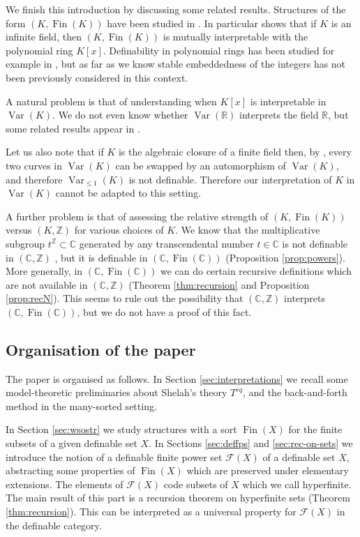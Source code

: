 \documentclass{amsart}
\newcommand{\R}{\mathbb R}
\newcommand{\C}{\mathbb C}
\newcommand{\Z}{\mathbb Z}
\newcommand{\Fin}{\operatorname{Fin}}
\theoremstyle{plain}
\theoremstyle{definition}
\newcommand{\F}{\mathcal{F}}
\newcommand{\Var}[1]{\operatorname{Var}(#1)}
\newcommand{\nVar}[2]{\operatorname{Var}_{#2} (#1)}
\begin{document}
We finish this introduction by discussing some related results. 
Structures of the form $(K, \Fin(K))$ have been studied in \cite{Bau}. In particular \cite{Bau} shows that if $K$ is an infinite field, then $(K, \Fin(K))$ is mutually interpretable with the polynomial ring $K[x]$. Definability in polynomial rings has been studied for example in \cite[Chapter 3]{JL}, but as far as we know stable embeddedness of the integers has not been previously considered in this context.  

A natural problem is that of understanding when $K[x]$ is interpretable in $\Var K$. We do not even know whether $\Var {\R}$ interprets the field $\R$, but some related results appear in \cite{Ast, Tre}. 

Let us also note that if $K$ is the algebraic closure of a finite field then, by \cite{Wie}, every two curves in $\Var{K}$ can be swapped by an automorphism of $\Var{K}$, and therefore $\nVar{K}{\leq 1}$ is not definable. Therefore our interpretation of $K$ in $\Var{K}$ cannot be adapted to this setting.

A further problem is that of assessing the relative strength of $(K, \Fin(K))$ versus $(K, \Z)$ for various choices of $K$. We know that the multiplicative subgroup $t^\Z\subset \C$ generated by any transcendental number $t\in \C$ is not definable in $(\C, \Z)$ \cite[Proposition 2.2]{Toffalori2010}, but it is definable in $(\C, \Fin(\C))$ (Proposition \ref{prop:powers}). More generally, in $(\C, \Fin(\C))$ we can do certain recursive definitions which are not available in $(\C, \Z)$ (Theorem \ref{thm:recursion} and Proposition \ref{prop:recN}). This seems to rule out the possibility that $(\C, \Z)$ interprets $(\C, \Fin(\C))$, but we do not have a proof of this fact.  



\subsection{Organisation of the paper} The paper is organised as follows. In Section \ref{sec:interpretations} we recall some model-theoretic preliminaries about Shelah's theory $T^{eq}$, and the back-and-forth method in the many-sorted setting. 
 
 In Section \ref{sec:wsostr} we study structures with a sort $\Fin(X)$ for the finite subsets of a given definable set $X$. In Sections
 \ref{sec:deffps} and \ref{sec:rec-on-sets} we introduce the notion of a definable finite power set $\F(X)$ of a definable set $X$, abstracting some properties of $\Fin(X)$ which are preserved under elementary extensions. The elements of $\F(X)$ code subsets of $X$ which we call hyperfinite. The main result of this part is a recursion theorem on hyperfinite sets (Theorem \ref{thm:recursion}). This can be interpreted as a universal property for $\F(X)$ in the definable category. 
\end{document}
